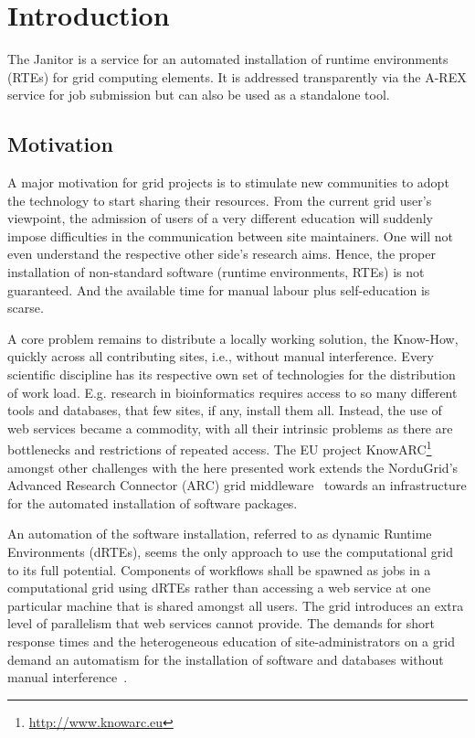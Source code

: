\chapter{Introduction}

The Janitor is a service for an automated installation of runtime
environments (RTEs) for grid computing elements.  It is addressed
transparently via the A-REX service for job submission but can also be
used as a standalone tool.

\section{Motivation}

A major motivation for grid projects is to stimulate new communities
to adopt the technology to start sharing their resources. From the
current grid user's viewpoint, the admission of users of a very different
education will suddenly impose difficulties in the communication between
site maintainers. One will not even understand the respective other side's
research aims. Hence, the proper installation of non-standard software
(runtime environments, RTEs) is not guaranteed. And the available time for
manual labour plus self-education is scarse.

A core problem remains to distribute a locally working solution, the
Know-How, quickly across all contributing sites, i.e., without manual
interference. Every scientific discipline has its respective own set
of technologies for the distribution of work load. E.g. research in
bioinformatics requires access to so many different tools and databases,
that few sites, if any, install them all. Instead, the use of web
services became a commodity, with all their intrinsic problems as there
are bottlenecks and restrictions of repeated access.  The EU project
KnowARC\footnote{\href{http://www.knowarc.eu}{http://www.knowarc.eu}}
amongst other challenges with the here presented work
extends the NorduGrid's Advanced Research Connector (ARC) grid
middleware~\cite{ELLERT_2007} towards an infrastructure for the automated
installation of software packages.

An automation of the software installation, referred to as dynamic
Runtime Environments (dRTEs), seems the only approach to use the
computational grid to its full potential. Components of workflows
shall be spawned as jobs in a computational grid using dRTEs rather
than accessing a web service at one particular machine that is shared
amongst all users.  The grid introduces an extra level of parallelism
that web services cannot provide. The demands for short response times
and the heterogeneous education of site-administrators on a grid demand
an automatism for the installation of software and databases without
manual interference~\cite{BAYER_2007}.

